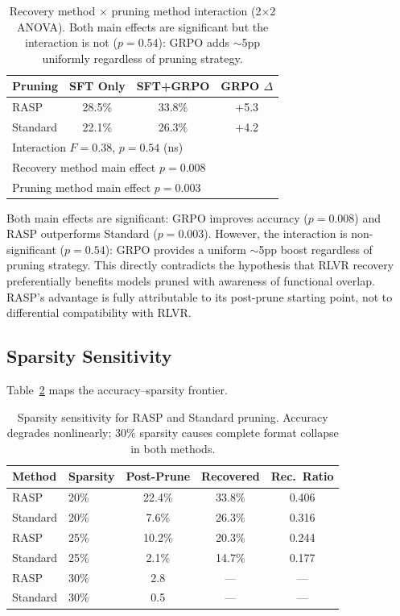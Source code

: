 \documentclass[11pt,a4paper]{article}
\begin{document}
\begin{table}[t]
\centering
\small
\begin{tabular}{lccc}
\toprule
\textbf{Pruning} & \textbf{SFT Only} & \textbf{SFT+GRPO} & \textbf{GRPO $\Delta$} \\
\midrule
RASP & 28.5\% & 33.8\% & +5.3 \\
Standard & 22.1\% & 26.3\% & +4.2 \\
\midrule
\multicolumn{4}{l}{Interaction $F = 0.38$, $p = 0.54$ (ns)} \\
\multicolumn{4}{l}{Recovery method main effect $p = 0.008$} \\
\multicolumn{4}{l}{Pruning method main effect $p = 0.003$} \\
\bottomrule
\end{tabular}
\caption{Recovery method $\times$ pruning method interaction (2$\times$2 ANOVA). Both main effects are significant but the interaction is not ($p=0.54$): GRPO adds $\sim$5pp uniformly regardless of pruning strategy.}
\label{tab:interaction}
\end{table}

Both main effects are significant: GRPO improves accuracy ($p = 0.008$) and RASP outperforms Standard ($p = 0.003$).
However, the interaction is non-significant ($p = 0.54$): GRPO provides a uniform $\sim$5pp boost regardless of pruning strategy.
This directly contradicts the hypothesis that RLVR recovery preferentially benefits models pruned with awareness of functional overlap.
RASP's advantage is fully attributable to its post-prune starting point, not to differential compatibility with RLVR.

\subsection{Sparsity Sensitivity}
\label{sec:sparsity}

Table~\ref{tab:sparsity} maps the accuracy--sparsity frontier.

\begin{table}[t]
\centering
\small
\begin{tabular}{llccc}
\toprule
\textbf{Method} & \textbf{Sparsity} & \textbf{Post-Prune} & \textbf{Recovered} & \textbf{Rec.\ Ratio} \\
\midrule
RASP & 20\% & 22.4\% & 33.8\% & 0.406 \\
Standard & 20\% & 7.6\% & 26.3\% & 0.316 \\
\midrule
RASP & 25\% & 10.2\% & 20.3\% & 0.244 \\
Standard & 25\% & 2.1\% & 14.7\% & 0.177 \\
\midrule
RASP & 30\% & 2.8 & --- & --- \\
Standard & 30\% & 0.5 & --- & --- \\
\bottomrule
\end{tabular}
\caption{Sparsity sensitivity for RASP and Standard pruning. Accuracy degrades nonlinearly; 30\% sparsity causes complete format collapse in both methods.}
\label{tab:sparsity}
\end{table}
\end{document}
